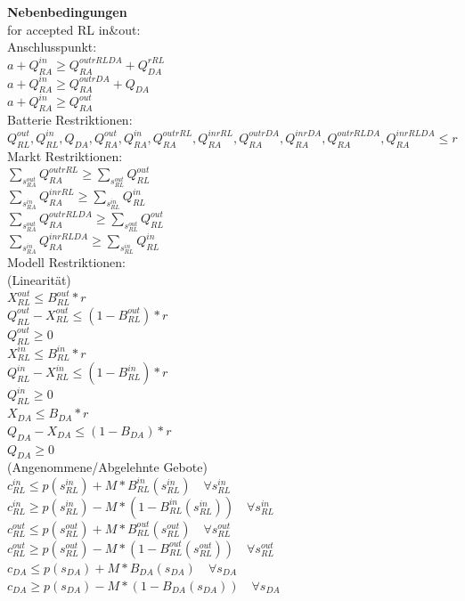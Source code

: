 \documentclass{article}
\begin{document}
\textbf{Nebenbedingungen}\\
for accepted RL in\&out:\\
Anschlusspunkt:\\
$a + Q^{in}_{RA} \geq Q^{outrRLDA}_{RA} + Q^{rRL}_{DA}$ \\
$a + Q^{in}_{RA} \geq Q^{outrDA}_{RA} + Q_{DA}$ \\
$a + Q^{in}_{RA} \geq Q^{out}_{RA}$ \\
Batterie Restriktionen:\\
$Q^{out}_{RL}, Q^{in}_{RL}, Q_{DA}, Q^{out}_{RA}, Q^{in}_{RA}, Q^{outrRL}_{RA}, Q^{inrRL}_{RA}, Q^{outrDA}_{RA}, Q^{inrDA}_{RA}, Q^{outrRLDA}_{RA}, Q^{inrRLDA}_{RA} \leq r$\\
Markt Restriktionen:\\
$\sum_{s^{out}_{RA}} Q^{outrRL}_{RA} \geq \sum_{s^{out}_{RL}} Q^{out}_{RL} $\\
$\sum_{s^{in}_{RA}} Q^{inrRL}_{RA} \geq \sum_{s^{in}_{RL}} Q^{in}_{RL} $\\
$\sum_{s^{out}_{RA}} Q^{outrRLDA}_{RA} \geq \sum_{s^{out}_{RL}} Q^{out}_{RL} $\\
$\sum_{s^{in}_{RA}} Q^{inrRLDA}_{RA} \geq \sum_{s^{in}_{RL}} Q^{in}_{RL} $\\
Modell Restriktionen:\\
(Linearität)\\
$X^{out}_{RL} \leq B^{out}_{RL} * r$ \\
$Q^{out}_{RL} - X^{out}_{RL} \leq (1-B^{out}_{RL}) * r$ \\
$Q^{out}_{RL} \geq 0$ \\
$X^{in}_{RL} \leq B^{in}_{RL} * r$ \\
$Q^{in}_{RL} - X^{in}_{RL} \leq (1-B^{in}_{RL}) * r$ \\
$Q^{in}_{RL} \geq 0$ \\
$X_{DA} \leq B_{DA} * r$ \\
$Q_{DA} - X_{DA} \leq (1-B_{DA}) * r$ \\
$Q_{DA} \geq 0$ \\
(Angenommene/Abgelehnte Gebote)\\
$c^{in}_{RL} \leq p(s^{in}_{RL}) + M * B^{in}_{RL}(s^{in}_{RL})\quad\forall s^{in}_{RL} $ \\
$c^{in}_{RL} \geq p(s^{in}_{RL}) - M * (1 - B^{in}_{RL}(s^{in}_{RL}))\quad\forall s^{in}_{RL} $ \\
$c^{out}_{RL} \leq p(s^{out}_{RL}) + M * B^{out}_{RL}(s^{out}_{RL})\quad\forall s^{out}_{RL} $ \\
$c^{out}_{RL} \geq p(s^{out}_{RL}) - M * (1 - B^{out}_{RL}(s^{out}_{RL}))\quad\forall s^{out}_{RL} $ \\
$c_{DA} \leq p(s_{DA}) + M * B_{DA}(s_{DA})\quad\forall s_{DA} $ \\
$c_{DA} \geq p(s_{DA}) - M * (1 - B_{DA}(s_{DA}))\quad\forall s_{DA} $ \\
\end{document}
